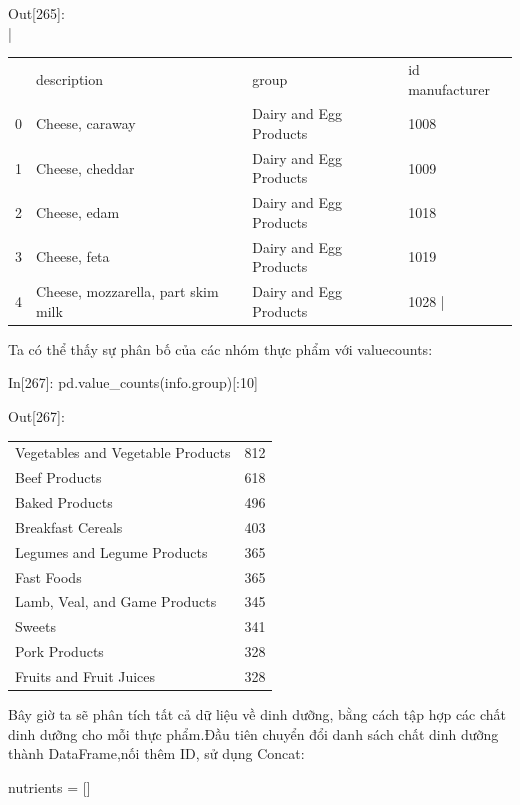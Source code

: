 \par\quad\textup {Out[265]:}\\
\bar\quad\begin{tabular}{llll}
& description& group& id manufacturer\\
0 &Cheese, caraway& Dairy and Egg Products &1008\\
1 &Cheese, cheddar &Dairy and Egg Products &1009\\
2 &Cheese, edam &Dairy and Egg Products& 1018\\
3 &Cheese, feta &Dairy and Egg Products &1019\\
4 &Cheese, mozzarella, part skim milk & Dairy and Egg Products  &1028
\bar\end{tabular}
\par\textup{Ta có thể thấy sự phân bố của các nhóm thực phẩm với value\textunderscore counts:}
\par\quad\textup{In[267]: pd.value\_counts(info.group)[:10]}
\par\quad\textup{Out[267]:}
\par\quad\begin{tabular}{ll}
\par Vegetables and Vegetable Products & 812\\
\par Beef Products&  618\\
\par Baked Products & 496\\
\par Breakfast Cereals&  403\\
\par Legumes and Legume Products&  365\\
\par Fast Foods&  365\\
\par Lamb, Veal, and Game Products & 345\\
\par Sweets & 341\\
\par Pork Products&  328\\
\par Fruits and Fruit Juices&  328\\
\end{tabular}
\par\textup{Bây giờ ta sẽ phân tích tất cả dữ liệu về dinh dưỡng, bằng cách tập hợp các chất dinh dưỡng cho mỗi thực phẩm.Đầu tiên chuyển đổi danh sách chất dinh dưỡng thành DataFrame,nối thêm ID, sử dụng Concat:}
\par\quad\textup{nutrients = []}

